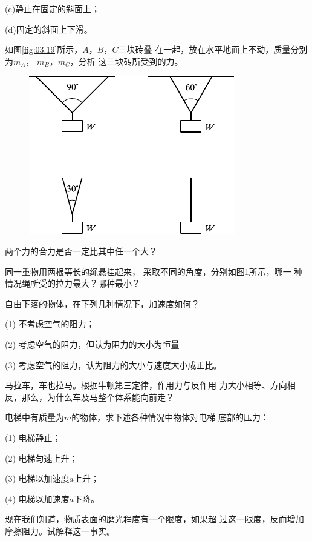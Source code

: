 \begin{questions}
  (c)静止在固定的斜面上；

  (d)固定的斜面上下滑。

  \question 如图\ref{fig:03.19}所示，$ A $，$ B $，$ C $三块砖叠
  在一起，放在水平地面上不动，质量分别
  为$ m_A $， $ m _ B $，$ m_C $，分析
  这三块砖所受到的力。

  \begin{figure}
    \vspace{-2em}
    \centering
    \includegraphics{figure/fig03.20}
    \caption{}
    \label{fig:03.20}
  \end{figure}
  \question 两个力的合力是否一定比其中任一个大？

  \question 同一重物用两根等长的绳悬挂起来，
  采取不同的角度，分别如图\ref{fig:03.20}所示，哪一
  种情况绳所受的拉力最大？哪种最小？

  \clearpage
  \question 自由下落的物体，在下列几种情况下，加速度如何？

  (1) 不考虑空气的阻力；

  (2) 考虑空气的阻力，但认为阻力的大小为恒量

  (3) 考虑空气的阻力，认为阻力的大小与速度大小成正比。

  \question 马拉车，车也拉马。根据牛顿第三定律，作用力与反作用
  力大小相等、方向相反，那么，为什么车及马整个体系能向前走？

  \question 电梯中有质量为$ m $的物体，求下述各种情况中物体对电梯
  底部的压力：

  (1) 电梯静止；

  (2) 电梯匀速上升；

  (3) 电梯以加速度$ a $上升；

  (4) 电梯以加速度$ a $下降。

  \question 现在我们知道，物质表面的磨光程度有一个限度，如果超
  过这一限度，反而增加摩擦阻力。试解释这一事实。


\end{questions}
